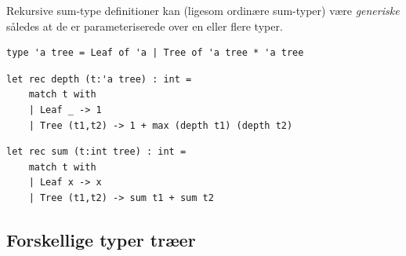 \documentclass[rgb]{beamer}
\begin{document}
\begin{frame}[fragile]
\begin{footnotesize}

  \vspace{1ex}

  Rekursive sum-type definitioner kan (ligesom ordinære sum-typer) være \emph{generiske} således at de er
  parameteriserede over en eller flere typer.

  \vspace{1ex}


\begin{lstlisting}[numbers=none,frame=none,mathescape]
  type 'a tree = Leaf of 'a | Tree of 'a tree * 'a tree
\end{lstlisting}

  \vspace{1ex}
\begin{lstlisting}[numbers=none,frame=none,mathescape]
  let rec depth (t:'a tree) : int =
    match t with
    | Leaf _ -> 1
    | Tree (t1,t2) -> 1 + max (depth t1) (depth t2)
\end{lstlisting}

  \vspace{1ex}

\begin{lstlisting}[numbers=none,frame=none,mathescape]
  let rec sum (t:int tree) : int =
    match t with
    | Leaf x -> x
    | Tree (t1,t2) -> sum t1 + sum t2
\end{lstlisting}

\end{footnotesize}
\end{frame}

\subsection{Forskellige typer træer}
\end{document}
